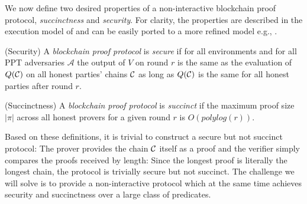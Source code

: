 

\medskip
{}
We now define two desired properties of a non-interactive blockchain proof protocol, \textit{succinctness} and \textit{security}. For clarity, the properties are described in the execution model of \cite{backbone} and can be easily ported to a more refined model e.g., \cite{PSS}. 

\begin{definition}{(Security)}
A \textit{blockchain proof protocol} is \textit{secure} if for all environments
and for all PPT adversaries $\mathcal{A}$ the output of $V$ on round $r$ is the
same as the evaluation of $Q(\mathcal{C})$ on all honest parties' chains $\mathcal{C}$ as
long as $Q(\mathcal{C})$ is the same for all honest parties after round $r$.
\end{definition}

\begin{definition}{(Succinctness)}
A \textit{blockchain proof protocol} is \textit{succinct} if the maximum proof
size $|\pi|$ across all honest provers for a given round $r$ is
$O(polylog(r))$.
\end{definition}

Based on these definitions, it is trivial to construct a secure but not succinct
protocol: The prover provides the chain $\mathcal{C}$ itself as a proof and the
verifier simply compares the proofs received by length: Since the longest proof
is literally the longest chain, the protocol is trivially secure but not
succinct. The challenge we will solve is to provide a
non-interactive protocol which at the same time achieves security and
succinctness over a large class of predicates.
